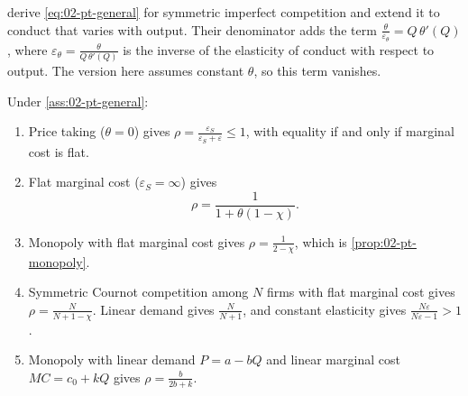 \citet[eq.~(2), p.~548]{WeylFabinger2013} derive \eqref{eq:02-pt-general} for symmetric imperfect competition
and extend it to conduct that varies with output. Their denominator adds the term $\frac{\theta}{\varepsilon_\theta}
= Q\,\theta'(Q)$, where $\varepsilon_\theta = \frac{\theta}{Q\,\theta'(Q)}$ is the inverse of the elasticity of
conduct with respect to output. The version here assumes constant $\theta$, so this term vanishes.

\begin{corollary}\label{cor:02-pt-cases}
Under \cref{ass:02-pt-general}:
\begin{enumerate}[label=(\roman*)]
\item Price taking ($\theta = 0$) gives $\rho = \frac{\varepsilon_S}{\varepsilon_S + \varepsilon} \le 1$, with
  equality if and only if marginal cost is flat.
\item Flat marginal cost ($\varepsilon_S = \infty$) gives
  \begin{equation}\label{eq:02-pt-flat}
  \rho = \frac{1}{1 + \theta(1 - \chi)} .
  \end{equation}
\item Monopoly with flat marginal cost gives $\rho = \frac{1}{2 - \chi}$, which is \cref{prop:02-pt-monopoly}.
\item Symmetric Cournot competition among $N$ firms with flat marginal cost gives
  $\rho = \frac{N}{N + 1 - \chi}$. Linear demand gives $\frac{N}{N + 1}$, and constant elasticity gives
  $\frac{N\varepsilon}{N\varepsilon - 1} > 1$.
\item Monopoly with linear demand $P = a - bQ$ and linear marginal cost $MC = c_0 + kQ$ gives
  $\rho = \frac{b}{2b + k}$.
\end{enumerate}
\end{corollary}

